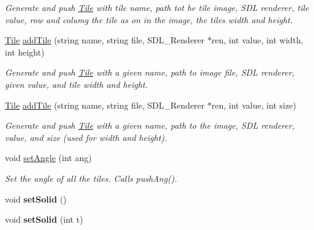 \begin{DoxyCompactItemize}
\begin{DoxyCompactList}\small\item\em Generate and push \hyperlink{classTile}{Tile} with tile name, path tot he tile image, S\+DL renderer, tile value, row and columg the tile as on in the image, the tiles width and height. \end{DoxyCompactList}\item 
\hyperlink{classTile}{Tile} \hyperlink{classTileset_af8022d2b4129de86c132172ac8ce23a5}{add\+Tile} (string name, string file, S\+D\+L\+\_\+\+Renderer $\ast$ren, int value, int width, int height)\hypertarget{classTileset_af8022d2b4129de86c132172ac8ce23a5}{}\label{classTileset_af8022d2b4129de86c132172ac8ce23a5}

\begin{DoxyCompactList}\small\item\em Generate and push \hyperlink{classTile}{Tile} with a given name, path to image file, S\+DL renderer, given value, and tile width and height. \end{DoxyCompactList}\item 
\hyperlink{classTile}{Tile} \hyperlink{classTileset_adc54ffeda362f79668abb0bad2f73296}{add\+Tile} (string name, string file, S\+D\+L\+\_\+\+Renderer $\ast$ren, int value, int size)\hypertarget{classTileset_adc54ffeda362f79668abb0bad2f73296}{}\label{classTileset_adc54ffeda362f79668abb0bad2f73296}

\begin{DoxyCompactList}\small\item\em Generate and push \hyperlink{classTile}{Tile} with a given name, path to the image, S\+DL renderer, value, and size (used for width and height). \end{DoxyCompactList}\item 
void \hyperlink{classTileset_ab1dab8dd83a80e5d49dcdb95f9841898}{set\+Angle} (int ang)\hypertarget{classTileset_ab1dab8dd83a80e5d49dcdb95f9841898}{}\label{classTileset_ab1dab8dd83a80e5d49dcdb95f9841898}

\begin{DoxyCompactList}\small\item\em Set the angle of all the tiles. Calls push\+Ang(). \end{DoxyCompactList}\item 
void {\bfseries set\+Solid} ()\hypertarget{classTileset_a87978787ae2529b915c0436b5872dd48}{}\label{classTileset_a87978787ae2529b915c0436b5872dd48}

\item 
void {\bfseries set\+Solid} (int t)\hypertarget{classTileset_aa4dd63b2c6422ed5a9b7d772963fe255}{}\label{classTileset_aa4dd63b2c6422ed5a9b7d772963fe255}


\end{DoxyCompactItemize}
